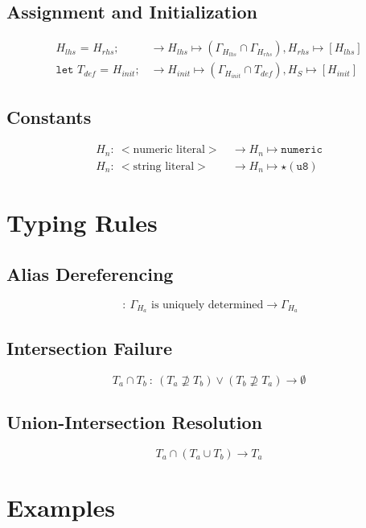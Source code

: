 \documentclass{article}
\begin{document}
\subsection{Assignment and Initialization}

\begin{align*}
    H_{lhs} \texttt{ = } H_{rhs}\texttt{;}\:             & \to H_{lhs} \mapsto (\Gamma_{H_{lhs}} \cap \Gamma_{H_{rhs}}), H_{rhs} \mapsto [H_{lhs}] \\
    \texttt{let }T_{def}\texttt{ = }H_{init}\texttt{;}\: & \to H_{init} \mapsto (\Gamma_{H_{init}} \cap T_{def}), H_S \mapsto [H_{init}]
\end{align*}

\subsection{Constants}

\begin{align*}
    H_n:\:<\textrm{numeric literal}>\: & \to H_n \mapsto \mathtt{numeric}   \\
    H_n:\:<\textrm{string literal}>\:  & \to H_n \mapsto \star(\mathtt{u8})
\end{align*}

\section{Typing Rules}

\subsection{Alias Dereferencing}

\begin{equation*}
    [H_{a}]\::\:\Gamma_{H_a}\textrm{ is uniquely determined} \to \Gamma_{H_{a}}
\end{equation*}

\subsection{Intersection Failure}

\begin{equation*}
    T_a \cap T_b\::\:(T_a \not\supseteq T_b) \vee (T_b \not\supseteq T_a) \to \emptyset
\end{equation*}

\subsection{Union-Intersection Resolution}

\begin{equation*}
    T_a \cap (T_a \cup T_b) \to T_a
\end{equation*}

\section{Examples}
\end{document}
